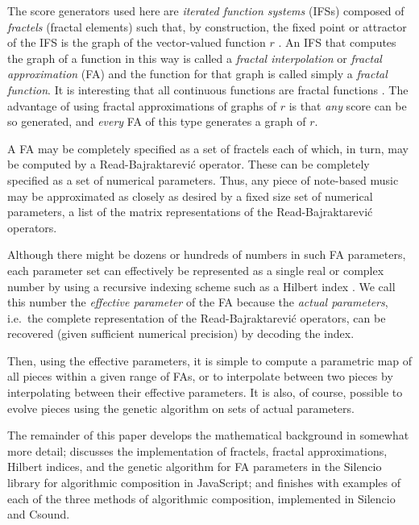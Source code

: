 \documentclass[english,11pt,letterpaper,onecolumn]{scrartcl}
\begin{document}
The score generators used here are \textit{iterated function systems} (IFSs) 
\cite{barnsley1985iterated, 10.2307/24893080, fractalseverywhere} composed of 
\textit{fractels} (fractal elements) such that, by construction, the fixed 
point or attractor of the IFS is the graph of the vector-valued function $r$ 
\cite{2016arXiv161001369B}. An IFS that computes the graph of a function in 
this way is called a \textit{fractal interpolation} or \textit{fractal 
approximation} (FA) \cite{Barnsley1986, fractalseverywhere, 
navascues2014fractal} and the function for that graph is called simply a 
\textit{fractal function}. It is interesting that all continuous functions are 
fractal functions \cite{2016arXiv161001369B}. The advantage of using fractal 
approximations of graphs of $r$ is that \textit{any} score can be so 
generated, and \textit{every} FA of this type generates a graph of $r$.

A FA may be completely specified as a set of fractels each of which, 
in turn, may be computed by a Read-Bajraktarevi\'{c} operator. These can be 
completely specified as a set of numerical parameters. Thus, any piece of 
note-based music may be approximated as closely as desired by a fixed size set 
of numerical parameters, a list of the matrix representations of the 
Read-Bajraktarevi\'{c} operators.

Although there might be dozens or hundreds of numbers in such FA parameters, 
each parameter set can effectively be represented as a single real or complex 
number by using a recursive indexing scheme such as a Hilbert index 
\cite{hamilton2006compact}. We call this number the \textit{effective 
parameter} of the FA because the \textit{actual parameters}, i.e.\ the 
complete representation of the Read-Bajraktarevi\'{c} operators, can be 
recovered (given sufficient numerical precision) by decoding the index. 

Then, using the effective parameters, it is simple to compute a parametric map 
of all pieces within a given range of FAs, or to interpolate between two 
pieces by interpolating between their effective parameters. It is also, of 
course, possible to evolve pieces using the genetic algorithm on sets of 
actual parameters.

The remainder of this paper develops the mathematical background in 
somewhat more detail; discusses the implementation of fractels, fractal 
approximations, Hilbert indices, and the genetic algorithm for FA parameters 
in the Silencio library for algorithmic composition in JavaScript; and 
finishes with examples of each of the three methods of algorithmic 
composition, implemented in Silencio and Csound.
\end{document}
